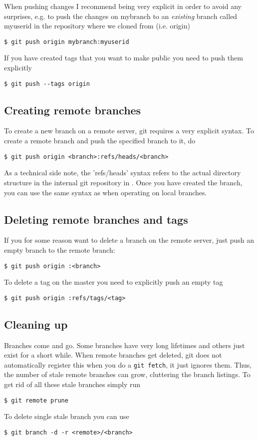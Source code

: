 \documentclass[a4paper,10pt]{article}
\begin{document}
When pushing changes I recommend being very explicit in order to avoid any
surprises, e.g. to push the changes on mybranch to an \emph{existing} branch
called myuserid in the repository where we cloned from (i.e. origin) 
\begin{verbatim}
$ git push origin mybranch:myuserid
\end{verbatim}
If you have created tags that you want to make public you need to push them
explicitly
\begin{verbatim}
$ git push --tags origin 
\end{verbatim}

\subsection{Creating remote branches} 
To create a new branch on a remote server, git
requires a very explicit syntax. To create a remote 
branch and push the specified branch to it, do
\begin{verbatim}
$ git push origin <branch>:refs/heads/<branch>
\end{verbatim}
As a technical side note, the 'refs/heads' syntax refers to the actual
directory structure in the internal git repository in .
Once you have created the branch, you can
use the same syntax as when operating on local branches. 

\subsection{Deleting remote branches and tags}
If you for some reason want to delete a branch
on the remote server, just push an empty branch to the remote branch:
\begin{verbatim}
$ git push origin :<branch>
\end{verbatim}

To delete a tag on the master you need to explicitly push an empty tag
\begin{verbatim}
$ git push origin :refs/tags/<tag>
\end{verbatim}

\subsection{Cleaning up}
Branches come and go. Some branches have very long lifetimes and others just
exist for a short while. When remote branches get deleted, git does not
automatically register this when you do a \texttt{git fetch}, it just ignores
them. Thus, the number of stale remote branches can grow, cluttering the
branch listings. To get rid of all these stale branches simply run 
\begin{verbatim}
$ git remote prune
\end{verbatim}
To delete single stale branch you can use
\begin{verbatim}
$ git branch -d -r <remote>/<branch>
\end{verbatim}
\end{document}
